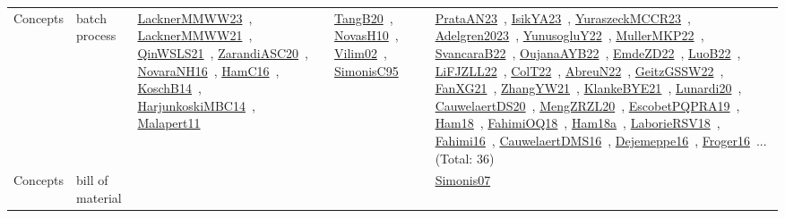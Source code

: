 {\begin{longtable}{lp{3cm}>{\raggedright\arraybackslash}p{6cm}>{\raggedright\arraybackslash}p{6cm}>{\raggedright\arraybackslash}p{8cm}}
Concepts & batch process & \href{works/LacknerMMWW23.pdf}{LacknerMMWW23}~\cite{LacknerMMWW23}, \href{works/LacknerMMWW21.pdf}{LacknerMMWW21}~\cite{LacknerMMWW21}, \href{works/QinWSLS21.pdf}{QinWSLS21}~\cite{QinWSLS21}, \href{works/ZarandiASC20.pdf}{ZarandiASC20}~\cite{ZarandiASC20}, \href{works/NovaraNH16.pdf}{NovaraNH16}~\cite{NovaraNH16}, \href{works/HamC16.pdf}{HamC16}~\cite{HamC16}, \href{works/KoschB14.pdf}{KoschB14}~\cite{KoschB14}, \href{works/HarjunkoskiMBC14.pdf}{HarjunkoskiMBC14}~\cite{HarjunkoskiMBC14}, \href{works/Malapert11.pdf}{Malapert11}~\cite{Malapert11} & \href{works/TangB20.pdf}{TangB20}~\cite{TangB20}, \href{works/NovasH10.pdf}{NovasH10}~\cite{NovasH10}, \href{works/Vilim02.pdf}{Vilim02}~\cite{Vilim02}, \href{works/SimonisC95.pdf}{SimonisC95}~\cite{SimonisC95} & \href{works/PrataAN23.pdf}{PrataAN23}~\cite{PrataAN23}, \href{works/IsikYA23.pdf}{IsikYA23}~\cite{IsikYA23}, \href{works/YuraszeckMCCR23.pdf}{YuraszeckMCCR23}~\cite{YuraszeckMCCR23}, \href{works/Adelgren2023.pdf}{Adelgren2023}~\cite{Adelgren2023}, \href{works/YunusogluY22.pdf}{YunusogluY22}~\cite{YunusogluY22}, \href{works/MullerMKP22.pdf}{MullerMKP22}~\cite{MullerMKP22}, \href{works/SvancaraB22.pdf}{SvancaraB22}~\cite{SvancaraB22}, \href{works/OujanaAYB22.pdf}{OujanaAYB22}~\cite{OujanaAYB22}, \href{works/EmdeZD22.pdf}{EmdeZD22}~\cite{EmdeZD22}, \href{works/LuoB22.pdf}{LuoB22}~\cite{LuoB22}, \href{works/LiFJZLL22.pdf}{LiFJZLL22}~\cite{LiFJZLL22}, \href{works/ColT22.pdf}{ColT22}~\cite{ColT22}, \href{works/AbreuN22.pdf}{AbreuN22}~\cite{AbreuN22}, \href{works/GeitzGSSW22.pdf}{GeitzGSSW22}~\cite{GeitzGSSW22}, \href{works/FanXG21.pdf}{FanXG21}~\cite{FanXG21}, \href{works/ZhangYW21.pdf}{ZhangYW21}~\cite{ZhangYW21}, \href{works/KlankeBYE21.pdf}{KlankeBYE21}~\cite{KlankeBYE21}, \href{works/Lunardi20.pdf}{Lunardi20}~\cite{Lunardi20}, \href{works/CauwelaertDS20.pdf}{CauwelaertDS20}~\cite{CauwelaertDS20}, \href{works/MengZRZL20.pdf}{MengZRZL20}~\cite{MengZRZL20}, \href{works/EscobetPQPRA19.pdf}{EscobetPQPRA19}~\cite{EscobetPQPRA19}, \href{works/Ham18.pdf}{Ham18}~\cite{Ham18}, \href{works/FahimiOQ18.pdf}{FahimiOQ18}~\cite{FahimiOQ18}, \href{works/Ham18a.pdf}{Ham18a}~\cite{Ham18a}, \href{works/LaborieRSV18.pdf}{LaborieRSV18}~\cite{LaborieRSV18}, \href{works/Fahimi16.pdf}{Fahimi16}~\cite{Fahimi16}, \href{works/CauwelaertDMS16.pdf}{CauwelaertDMS16}~\cite{CauwelaertDMS16}, \href{works/Dejemeppe16.pdf}{Dejemeppe16}~\cite{Dejemeppe16}, \href{works/Froger16.pdf}{Froger16}~\cite{Froger16}... (Total: 36)\\
Concepts & bill of material &  &  & \href{works/Simonis07.pdf}{Simonis07}~\cite{Simonis07}\\

\end{longtable}}
